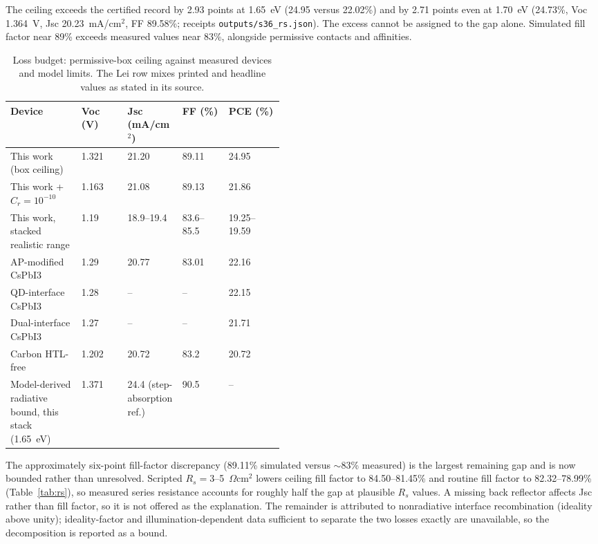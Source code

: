 \documentclass[11pt,a4paper]{article}
\begin{document}
The ceiling exceeds the certified record by 2.93 points at 1.65~eV (24.95 versus 22.02\%) and by 2.71 points even at 1.70~eV (24.73\%, Voc 1.364~V, Jsc 20.23~mA/cm$^2$, FF 89.58\%; receipts \texttt{outputs/s36\_rs.json}). The excess cannot be assigned to the gap alone. Simulated fill factor near 89\% exceeds measured values near 83\%, alongside permissive contacts and affinities.

\begin{table}[tbp]
\centering
\caption{Loss budget: permissive-box ceiling against measured devices and model limits. The Lei row mixes printed and headline values as stated in its source.}
\label{tab:loss}
\begingroup
\small
\begin{tabular}{|p{0.26\linewidth}|l|p{0.20\linewidth}|l|l|}
\hline\hline
Device & Voc (V) & Jsc (mA/cm$^2$) & FF (\%) & PCE (\%) \\
\hline
This work (box ceiling) & 1.321 & 21.20 & 89.11 & 24.95 \\
This work + $C_r=10^{-10}$ & 1.163 & 21.08 & 89.13 & 21.86 \\
This work, stacked realistic range & 1.19 & 18.9--19.4 & 83.6--85.5 & 19.25--19.59 \\
AP-modified CsPbI3~\cite{Lei2025} & 1.29 & 20.77 & 83.01 & 22.16 \\
QD-interface CsPbI3~\cite{XuQD2026} & 1.28 & -- & -- & 22.15 \\
Dual-interface CsPbI3~\cite{Zhang2026} & 1.27 & -- & -- & 21.71 \\
Carbon HTL-free~\cite{LiCarbon2026} & 1.202 & 20.72 & 83.2 & 20.72 \\
Model-derived radiative bound, this stack (1.65~eV) & 1.371 & 24.4 (step-absorption ref.) & 90.5 & \mbox{--} \\
\hline\hline
\end{tabular}
\endgroup
\end{table}

The approximately six-point fill-factor discrepancy (89.11\% simulated versus $\sim$83\% measured) is the largest remaining gap and is now bounded rather than unresolved. Scripted $R_s=3$--5~$\Omega$cm$^2$ lowers ceiling fill factor to 84.50--81.45\% and routine fill factor to 82.32--78.99\% (Table~\ref{tab:rs}), so measured series resistance accounts for roughly half the gap at plausible $R_s$ values. A missing back reflector affects Jsc rather than fill factor, so it is not offered as the explanation. The remainder is attributed to nonradiative interface recombination (ideality above unity); ideality-factor and illumination-dependent data sufficient to separate the two losses exactly are unavailable, so the decomposition is reported as a bound.
\end{document}
